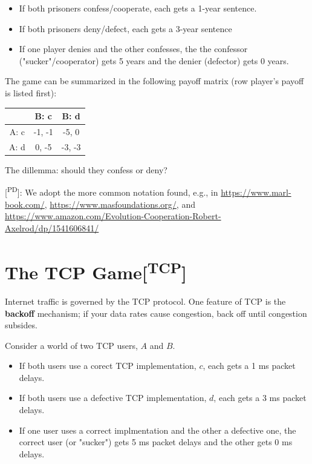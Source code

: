 \documentclass[11pt]{article}
\begin{document}
\begin{itemize}
\item If both prisoners confess/cooperate, each gets a 1-year sentence.
\item If both prisoners deny/defect, each gets a 3-year sentence
\item If one player denies and the other confesses, the the confessor ("sucker"/cooperator) gets 5 years and the denier (defector) gets 0 years.
\end{itemize}

The game can be summarized in the following payoff matrix (row player's payoff is listed first):


\begin{tabular}{|c|c|c|}\hline
       & B: c         & B: d         \\\hline
A: c & -1, -1 & -5, 0 \\\hline
A: d & 0, -5  & -3, -3 \\\hline
\end{tabular}


The dillemma: should they confess or deny?

{[}\textsuperscript{PD}]: We adopt the more common notation found, e.g., in \url{https://www.marl-book.com/}, \url{https://www.masfoundations.org/}, and \url{https://www.amazon.com/Evolution-Cooperation-Robert-Axelrod/dp/1541606841/}
\section{The TCP Game[\textsuperscript{TCP}]}
\label{sec:org40d73aa}

Internet traffic is governed by the TCP protocol. One feature of TCP is the \textbf{backoff} mechanism; if your data rates cause congestion, back off until congestion subsides.

Consider a world of two TCP users, \(A\) and \(B\).

\begin{itemize}
\item If both users use a corect TCP implementation, \(c\), each gets a 1 ms packet delays.
\item If both users use a defective TCP implementation, \(d\), each gets a 3 ms packet delays.
\item If one user uses a correct implmentation and the other a defective one, the correct user (or "sucker") gets 5 ms packet delays and the other gets 0 ms delays.
\end{itemize}
\end{document}
